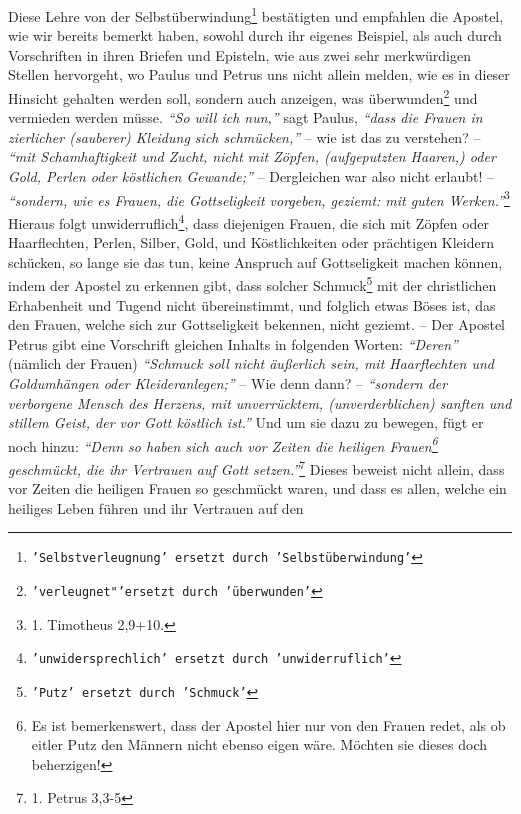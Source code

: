 Diese Lehre von der Selbstüberwindung\footnote{\texttt{'Selbstverleugnung'
ersetzt 
durch 'Selbstüberwindung'}} bestätigten und empfahlen die Apostel, wie
wir bereits bemerkt haben, sowohl durch ihr eigenes Beispiel, als auch durch
Vorschriften in ihren Briefen und Episteln, wie aus zwei sehr merkwürdigen
Stellen hervorgeht, wo Paulus und Petrus uns nicht allein melden, wie es in
dieser Hinsicht gehalten werden soll, sondern auch anzeigen, was
überwunden\footnote{\texttt{'verleugnet"'ersetzt durch 'überwunden'}} und
vermieden werden müsse. \textit{"`So will ich nun,"'} sagt
Paulus,
\textit{"`dass die Frauen in
zierlicher (sauberer) Kleidung sich schmücken,"'} -- wie ist das zu verstehen?
--
\textit{"`mit Schamhaftigkeit und Zucht, nicht mit Zöpfen, (aufgeputzten
Haaren,) oder
Gold, Perlen oder köstlichen Gewande;"'} -- Dergleichen war also nicht
erlaubt! -- \textit{"`sondern, wie es Frauen, die Gottseligkeit vorgeben,
geziemt: mit
guten Werken."'}\footnote{1. Timotheus 2,9+10.}
Hieraus folgt unwiderruflich\footnote{\texttt{'unwidersprechlich' ersetzt durch
'unwiderruflich'}}, dass
diejenigen Frauen, die sich mit Zöpfen oder
Haarflechten, Perlen, Silber, Gold,
und Köstlichkeiten oder prächtigen Kleidern schücken, so lange sie das tun,
keine Anspruch auf Gottseligkeit machen können, indem der
Apostel zu erkennen
gibt, dass solcher Schmuck\footnote{\texttt{'Putz' ersetzt durch 'Schmuck'}}
mit 
der christlichen Erhabenheit und Tugend nicht
übereinstimmt, und folglich etwas Böses ist, das den Frauen, welche sich zur
Gottseligkeit bekennen, nicht geziemt. -- Der Apostel Petrus gibt eine
Vorschrift gleichen Inhalts in folgenden Worten: \textit{"`Deren"'} (nämlich der
Frauen)
\textit{"`Schmuck soll nicht äußerlich sein, mit Haarflechten und Goldumhängen
oder
Kleideranlegen;"'} -- Wie denn dann? --
\textit{"`sondern der verborgene Mensch des Herzens,
mit unverrücktem, (unverderblichen) sanften und stillem Geist, der vor Gott
köstlich ist."'} Und um sie dazu zu bewegen, fügt er noch hinzu:
\textit{"`Denn so haben
sich auch vor Zeiten die heiligen Frauen\footnote{Es ist bemerkenswert, dass der
Apostel hier nur von den Frauen redet, als ob eitler Putz den
Männern nicht ebenso eigen wäre. Möchten sie dieses doch beherzigen!}
geschmückt,
die ihr Vertrauen auf Gott setzen."'}\footnote{1. Petrus 3,3-5}
Dieses beweist nicht allein, dass vor Zeiten die heiligen
Frauen so 
geschmückt waren,
und dass es allen, welche ein heiliges Leben führen und ihr Vertrauen auf den
